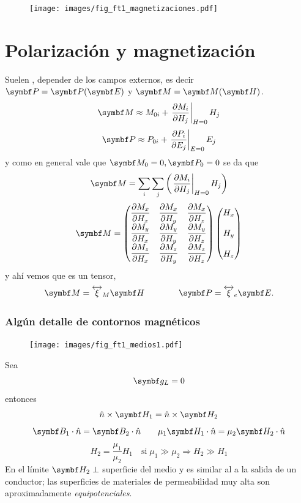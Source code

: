 \documentclass[10pt,oneside]{CBFT_book}
\begin{document}
\begin{figure}[htb]
	\begin{center}
	\texttt{[image: images/fig\_ft1\_magnetizaciones.pdf]}	 
	\end{center}
	\caption{}
\end{figure}


\section{Polarización y magnetización}

Suelen , depender de los campos externos, es decir $\vb{P}=\vb{P}(\vb{E})$ y 
$\vb{M}=\vb{M}(\vb{H})$.
\[
	\vb{M} \approx M_{0i} + \left.\dpar{M_i}{H_j}\right|_{H=0} H_j
\]
\[
	\vb{P} \approx P_{0i} + \left.\dpar{P_i}{E_j}\right|_{E=0} E_j
\]
y como en general vale que $\vb{M}_0=0, \vb{P}_0=0$  se da que 
\[
	\vb{M} = \sum_i \sum_j \left( \left.\dpar{M_i}{H_j}\right|_{H=0} H_j \right) 
\]
\[
	\vb{M} = 
	\begin{pmatrix}
	 \displaystyle{\dpar{M_x}{H_x}} & \displaystyle{\dpar{M_x}{H_y}} & \displaystyle{\dpar{M_x}{H_z}} \\
	 \displaystyle{\dpar{M_y}{H_x}} & \displaystyle{\dpar{M_y}{H_y}} & \displaystyle{\dpar{M_y}{H_z}} \\
	 \displaystyle{\dpar{M_z}{H_x}} & \displaystyle{\dpar{M_z}{H_y}} & \displaystyle{\dpar{M_z}{H_z}}
	\end{pmatrix}
	\begin{pmatrix}
	 \displaystyle{H_x} \\
	 \\
	 H_y \\
	 \\
	 H_z
	\end{pmatrix}
\]
y ahí vemos que es un tensor,
\[
	\vb{M} = \overleftrightarrow{\xi}_M \vb{H} \qquad\qquad \vb{P} =  \overleftrightarrow{\xi}_e \vb{E}.
\]

\subsubsection{Algún detalle de contornos magnéticos}

\begin{figure}[htb]
	\begin{center}
	\texttt{[image: images/fig\_ft1\_medios1.pdf]}	 
	\end{center}
	\caption{}
\end{figure}
Sea
\[
	\vb{g}_L = 0 
\]
entonces
\[
	\hat{n}\times\vb{H}_1 = \hat{n}\times\vb{H}_2
\]
\[
	\vb{B}_1\cdot\hat{n} = \vb{B}_2\cdot\hat{n} \qquad
		\mu_1\vb{H}_1\cdot\hat{n} = \mu_2\vb{H}_2\cdot\hat{n}
\]
\[
	H_2 = \frac{\mu_1}{\mu_2} H_1 \quad \text{si} \; \mu_1 \gg \mu_2 \Rightarrow H_2 \gg H_1
\]
En el límite $\vb{H}_2 \perp$ superficie del medio y es similar al  a la salida de un
conductor; las superficies de materiales de permeabilidad muy alta son aproximadamente {\it equipotenciales}.
\end{document}
